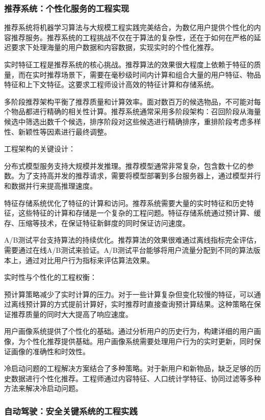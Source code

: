 \subsubsection{推荐系统：个性化服务的工程实现}

推荐系统将机器学习算法与大规模工程实践完美结合，为数亿用户提供个性化的内容推荐服务。推荐系统的工程挑战不仅在于算法的复杂性，还在于如何在严格的延迟要求下处理海量的用户数据和内容数据，实现实时的个性化推荐。

实时特征工程是推荐系统的核心挑战。推荐算法的效果很大程度上依赖于特征的质量，而在实时推荐场景下，需要在毫秒级时间内计算和组合大量的用户特征、物品特征和上下文特征。这要求工程师设计高效的特征计算和存储系统。

多阶段推荐架构平衡了推荐质量和计算效率。面对数百万的候选物品，不可能对每个物品都进行精确的相关性计算。推荐系统通常采用多阶段架构：召回阶段从海量候选中筛选出数千个候选，排序阶段对这些候选进行精确排序，重排阶段考虑多样性、新颖性等因素进行最终调整。

工程架构的关键设计：

分布式模型服务支持大规模并发推理。推荐模型通常非常复杂，包含数十亿的参数。为了支持高并发的推荐请求，需要将模型部署到多台服务器上，通过模型并行和数据并行来提高推理速度。

特征存储系统优化了特征的计算和访问。推荐系统需要大量的实时特征和历史特征，这些特征的计算和存储是一个复杂的工程问题。特征存储系统通过预计算、缓存、压缩等技术，在保证特征新鲜度的同时保证访问速度。

A/B测试平台支持算法的持续优化。推荐算法的效果很难通过离线指标完全评估，需要通过在线A/B测试来验证。A/B测试平台能够将用户流量分配到不同的算法版本上，通过对比用户行为指标来评估算法效果。

实时性与个性化的工程权衡：

预计算策略减少了实时计算的压力。对于一些计算复杂但变化较慢的特征，可以通过离线预计算的方式提前计算好，实时推荐时直接查询预计算结果。这种策略在保证推荐质量的同时大大提高了响应速度。

用户画像系统提供了个性化的基础。通过分析用户的历史行为，构建详细的用户画像，为个性化推荐提供基础。用户画像系统需要处理用户行为的实时更新，同时保证画像的准确性和时效性。

冷启动问题的工程解决方案结合了多种策略。对于新用户和新物品，缺乏足够的历史数据进行个性化推荐。工程师通过内容特征、人口统计学特征、协同过滤等多种方法来解决冷启动问题。

\subsubsection{自动驾驶：安全关键系统的工程实践}


